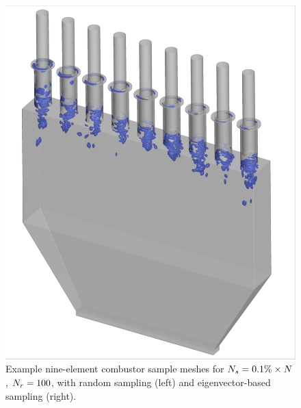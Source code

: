 \begin{figure}
\begin{minipage}{0.49\linewidth}
		\includegraphics[width=0.99\linewidth,trim={0.3em 0.3em 0.3em 0.3em},clip]{Chapters/HPROMResults/Images/nineElem/deim/iblank/eigenvec_iblank_iso.png}
	\end{minipage}
	\caption{\label{fig:nineElemIblankIso}Example nine-element combustor sample meshes for $N_s = 0.1\% \times N$, $N_r = 100$, with random sampling (left) and eigenvector-based sampling (right).}
\end{figure}

